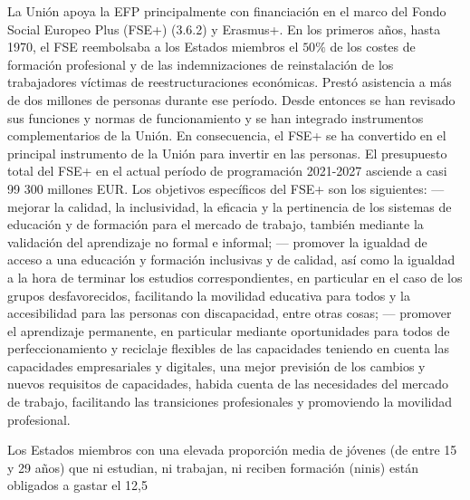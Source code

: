 \documentclass[10pt,a4paper]{article}
\begin{document}
La Unión apoya la EFP principalmente con financiación en el marco del Fondo Social Europeo Plus (FSE+) (3.6.2) y Erasmus+. En los primeros años, hasta 1970, el FSE reembolsaba a los Estados miembros el $50\%$ de los costes de formación profesional y de las indemnizaciones de reinstalación de los trabajadores víctimas de reestructuraciones económicas. Prestó asistencia a más de dos millones de personas durante ese período. Desde entonces se han revisado sus funciones y normas de funcionamiento y se han integrado instrumentos complementarios de la Unión. En consecuencia, el FSE+ se ha convertido en el principal instrumento de la Unión para invertir en las personas. El presupuesto total del FSE+ en el actual período de programación 2021-2027 asciende a casi 99 300 millones EUR. Los objetivos específicos del FSE+ son los siguientes: — mejorar la calidad, la inclusividad, la eficacia y la pertinencia de los sistemas de educación y de formación para el mercado de trabajo, también mediante la validación del aprendizaje no formal e informal; — promover la igualdad de acceso a una educación y formación inclusivas y de calidad, así como la igualdad a la hora de terminar los estudios correspondientes, en particular en el caso de los grupos desfavorecidos, facilitando la movilidad educativa para todos y la accesibilidad para las personas con discapacidad, entre otras cosas;
— promover el aprendizaje permanente, en particular mediante oportunidades para todos de perfeccionamiento y reciclaje flexibles de las capacidades teniendo en cuenta las capacidades empresariales y digitales, una mejor previsión de los cambios y nuevos requisitos de capacidades, habida cuenta de las necesidades del mercado de trabajo, facilitando las transiciones profesionales y promoviendo la movilidad profesional.

Los Estados miembros con una elevada proporción media de jóvenes (de entre 15 y 29 años) que ni estudian, ni trabajan, ni reciben formación (ninis) están obligados a gastar el 12,5 %
\end{document}
